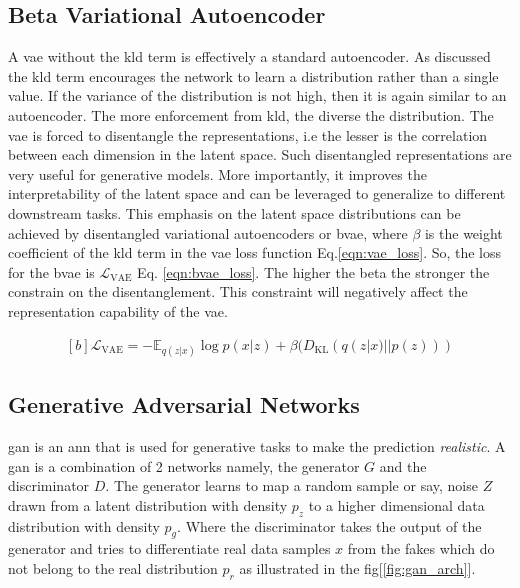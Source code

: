 \subsection{Beta Variational Autoencoder}

A \ac{vae} without the \ac{kld} term is effectively a standard autoencoder. As discussed the \ac{kld} term encourages the network to learn a distribution rather than a single value. If the variance of the distribution is not high, then it is again similar to an autoencoder. The more enforcement from \ac{kld}, the diverse the distribution. The \ac{vae} is forced to disentangle the representations, i.e the lesser is the correlation between each dimension in the latent space. Such disentangled representations are very useful for generative models. More importantly, it improves the interpretability of the latent space and can be leveraged to generalize to different downstream tasks. This emphasis on the latent space distributions can be achieved by disentangled variational autoencoders or \ac{bvae}, where $\beta$ is the weight coefficient of the \ac{kld} term in the \ac{vae} loss function Eq.\ref{eqn:vae_loss}. So, the loss for the \ac{bvae} is $\mathcal{L}_{\mathrm{VAE}}$ Eq. \ref{eqn:bvae_loss}. The higher the beta the stronger the constrain on the disentanglement. This constraint will negatively affect the representation capability of the \ac{vae}.

\begin{equation} \label{eqn:bvae_loss}
    \begin{gathered}[b]
        \mathcal{L}_{\mathrm{VAE}}=-\mathbb{E}_{q(z | x)} \log p(x | z) + \beta (D_{\mathrm{KL}}(q(z | x) || p(z)))
    \end{gathered}
\end{equation}

\subsection{Generative Adversarial Networks}
\ac{gan} is an \ac{ann} that is used for generative tasks to make the prediction \textit{realistic}. A \ac{gan} is a combination of 2 networks namely, the generator $G$ and the discriminator $D$. The generator learns to map a random sample or say, noise $Z$ drawn from a latent distribution with density $p_{z}$ to a higher dimensional data distribution with density $p_{g}$. Where the discriminator takes the output of the generator and tries to differentiate real data samples $x$ from the fakes which do not belong to the real distribution $p_{r}$  as illustrated in the fig[\ref{fig:gan_arch}].


